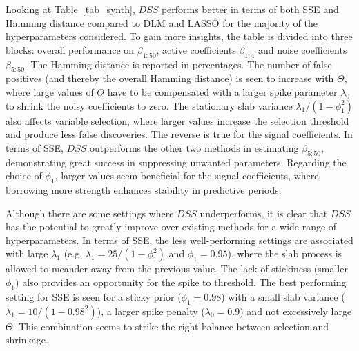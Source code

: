 \documentclass[ba]{imsart}
\numberwithin{equation}{section}
\theoremstyle{plain}
\begin{document}
Looking at Table~\ref{tab_synth}, $DSS$ performs better in terms of both SSE and Hamming distance compared to DLM  and LASSO for the majority of the hyperparameters considered. To gain more insights, the table is divided into three blocks: overall performance on $\beta_{1:50}$, active coefficients $\beta_{1:4}$ and noise coefficients $\beta_{5:50}$.
The Hamming distance is reported in percentages. The number of false positives (and thereby the overall Hamming distance) is seen to increase with $\Theta$, where  large values of $\Theta$ have to be compensated with a larger spike parameter $\lambda_0$ to shrink the noisy coefficients to zero. The stationary slab variance $\lambda_1/(1-\phi_1^2)$ also affects variable selection, where larger values increase the selection threshold and produce less false discoveries. The reverse is true for the signal coefficients. In terms of SSE, $DSS$ outperforms the other two methods in estimating  $\beta_{5:50}$, demonstrating great success in suppressing unwanted parameters. 
Regarding the choice of $\phi_1$, larger values seem beneficial for  the signal coefficients, where borrowing more strength enhances stability in predictive periods. 


Although there are some settings where $DSS$ underperforms, it is clear that $DSS$ has the potential to greatly improve over existing methods for a wide range of hyperparameters. In terms of SSE, the less well-performing settings are associated with large $\lambda_1$ (e.g. $\lambda_1=25/(1-\phi_1^2)$ and $\phi_1=0.95$), where the slab process is allowed to meander away from the previous value. The lack of stickiness (smaller $\phi_1)$ also provides an opportunity for the spike to threshold. The best performing setting for SSE is seen for a sticky prior ($\phi_1=0.98$) with a small slab variance ($\lambda_1=10/(1-0.98^2)$), a larger spike penalty ($\lambda_0=0.9$) and not excessively large $\Theta$. This combination seems to strike the right balance between selection and shrinkage.
\end{document}

